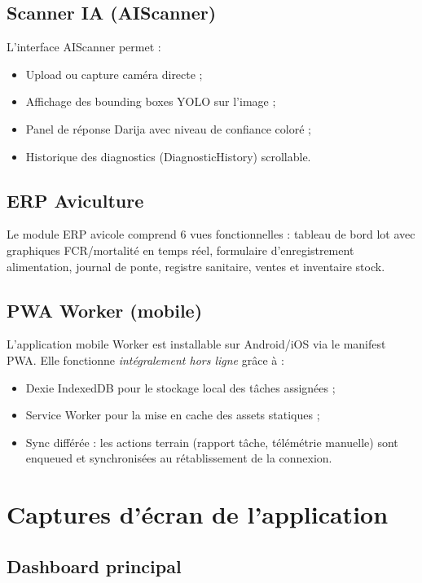 \subsection{Scanner IA (AIScanner)}

L'interface AIScanner permet :
\begin{itemize}
  \item Upload ou capture caméra directe ;
  \item Affichage des bounding boxes YOLO sur l'image ;
  \item Panel de réponse Darija avec niveau de confiance coloré ;
  \item Historique des diagnostics (DiagnosticHistory) scrollable.
\end{itemize}

\subsection{ERP Aviculture}

Le module ERP avicole comprend 6 vues fonctionnelles :
tableau de bord lot avec graphiques FCR/mortalité en temps réel,
formulaire d'enregistrement alimentation, journal de ponte,
registre sanitaire, ventes et inventaire stock.

\subsection{PWA Worker (mobile)}

L'application mobile Worker est installable sur Android/iOS via le
manifest PWA. Elle fonctionne \textit{intégralement hors ligne} grâce à :
\begin{itemize}
  \item Dexie IndexedDB pour le stockage local des tâches assignées ;
  \item Service Worker pour la mise en cache des assets statiques ;
  \item Sync différée : les actions terrain (rapport tâche, télémétrie manuelle)
        sont enqueued et synchronisées au rétablissement de la connexion.
\end{itemize}

\section{Captures d'écran de l'application}

\subsection{Dashboard principal}

